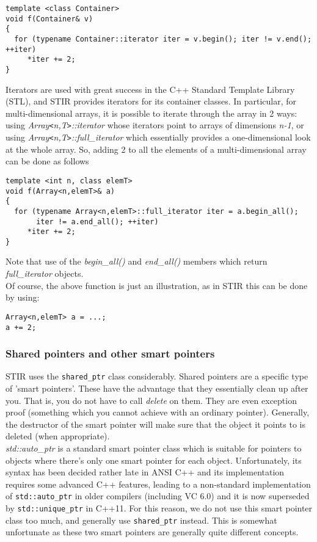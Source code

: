 \documentclass{article}
\begin{document}
\begin{verbatim}
template <class Container>
void f(Container& v)
{
  for (typename Container::iterator iter = v.begin(); iter != v.end(); ++iter)
     *iter += 2;
}
\end{verbatim}


Iterators are used with great success in the C++ Standard Template 
Library (STL), and STIR provides iterators for its container 
classes. In particular, for multi-dimensional arrays, it is possible 
to iterate through the array in 2 ways: using \textit{Array\texttt{<}n,T\texttt{>}::iterator} 
whose iterators point to arrays of dimensions \textit{n-1}, or using \textit{Array\texttt{<}n,T\texttt{>}::full\_iterator} which 
essentially provides a one-dimensional look at the whole array. 
So, adding 2 to all the elements of a multi-dimensional array 
can be done as follows

\begin{verbatim}
template <int n, class elemT>
void f(Array<n,elemT>& a)
{
  for (typename Array<n,elemT>::full_iterator iter = a.begin_all(); 
       iter != a.end_all(); ++iter)
     *iter += 2;
}
\end{verbatim}

Note that use of the \textit{begin\_all()} and \textit{end\_all()} members 
which return \textit{full\_iterator} objects. \\
Of course, the above function is just an illustration, as in 
STIR this can be done by using:


\begin{verbatim}
Array<n,elemT> a = ...;
a += 2;
\end{verbatim}


\subsubsection{
Shared pointers and other smart pointers \label{sect:sharedptr}}

STIR uses the \texttt{shared\_ptr} class considerably. Shared pointers 
are a specific type of 'smart pointers'. These have the advantage 
that they essentially clean up after you. That is, you do not 
have to call \textit{delete} on them. They are even exception proof 
(something which you cannot achieve with an ordinary pointer). 
Generally, the destructor of the smart pointer will make sure 
that the object it points to is deleted (when appropriate).\\
\textit{std::auto\_ptr} is a standard smart pointer class which is 
suitable for pointers to objects where there's only one smart 
pointer for each object. Unfortunately, its syntax has been decided 
rather late in ANSI C++ and its implementation requires some 
advanced C++ features, leading to a non-standard implementation 
of \texttt{std::auto\_ptr} in older compilers (including VC 6.0) and it is now
superseded by \texttt{std::unique\_ptr} in C++11. For this 
reason, we do not use this smart pointer class too much, and 
generally use \texttt{shared\_ptr} instead. This is somewhat unfortunate 
as these two smart pointers are generally quite different concepts. 
\end{document}
